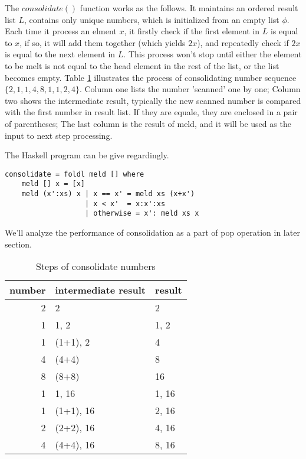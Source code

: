 \documentclass{article}
\begin{document}
The $consolidate()$ function works as the follows. It maintains an 
ordered result list $L$, contains only unique numbers, which is 
initialized from an empty list $\phi$. Each time it process an 
elment $x$, it firstly check if the first element in $L$ is equal
to $x$, if so, it will add them together (which yields $2x$), 
and repeatedly check if $2x$ is equal to the next element in $L$.
This process won't stop until either the element to be melt is
not equal to the head element in the rest of the list, or the 
list becomes empty. Table \ref{tb:num-consolidate} illustrates
the process of consolidating number sequence $\{2, 1, 1, 4, 8, 1, 1, 2, 4\}$.
Column one lists the number 'scanned' one by one; Column two
shows the intermediate result, typically the new scanned number
is compared with the first number in result list. If they
are equale, they are enclosed in a pair of parentheses; The
last column is the result of meld, and it will be used as the
input to next step processing.

The Haskell program can be give regardingly.

\lstset{language=Haskell}
\begin{lstlisting}
consolidate = foldl meld [] where
    meld [] x = [x]
    meld (x':xs) x | x == x' = meld xs (x+x')
                   | x < x'  = x:x':xs
                   | otherwise = x': meld xs x
\end{lstlisting}

We'll analyze the performance of consolidation as a part of
pop operation in later section.

\begin{table}
\caption{Steps of consolidate numbers} \label{tb:num-consolidate}
\centering
\begin{tabular}{r | l | l }
  \hline
  number & intermediate result & result \\
  \hline
  2 & 2 & 2 \\
  1 & 1, 2 & 1, 2 \\
  1 & (1+1), 2 & 4 \\
  4 & (4+4) & 8 \\
  8 & (8+8) & 16 \\
  1 & 1, 16 & 1, 16 \\
  1 & (1+1), 16 & 2, 16 \\
  2 & (2+2), 16 & 4, 16 \\
  4 & (4+4), 16 & 8, 16 \\
  \hline
\end{tabular}
\end{table}
\end{document}
